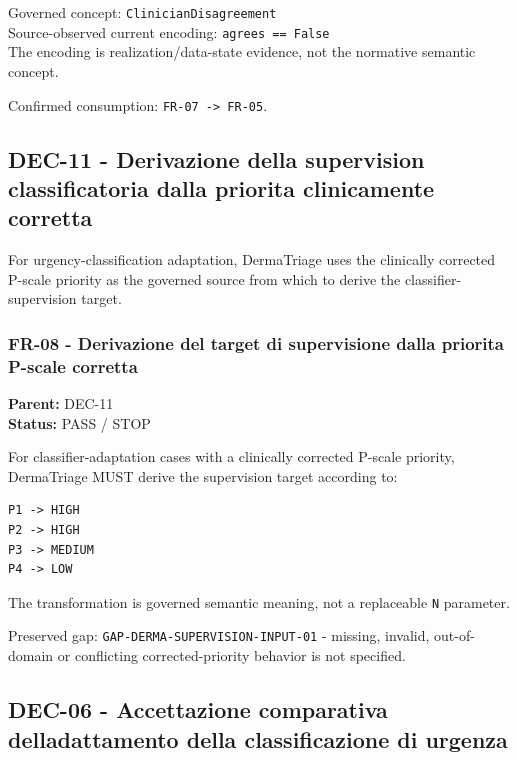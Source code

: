 \documentclass[11pt,a4paper]{article}
\begin{document}
Governed concept: \texttt{ClinicianDisagreement}\\
Source-observed current encoding: \texttt{agrees\ ==\ False}\\
The encoding is realization/data-state evidence, not the normative
semantic concept.

Confirmed consumption: \texttt{FR-07\ -\textgreater{}\ FR-05}.

\subsection{DEC-11 - Derivazione della supervision classificatoria dalla
priorita\textquotesingle{} clinicamente
corretta}\label{dec-11---derivazione-della-supervision-classificatoria-dalla-priorita-clinicamente-corretta}

For urgency-classification adaptation, DermaTriage uses the clinically
corrected P-scale priority as the governed source from which to derive
the classifier-supervision target.

\subsubsection{FR-08 - Derivazione del target di supervisione dalla
priorita\textquotesingle{} P-scale
corretta}\label{fr-08---derivazione-del-target-di-supervisione-dalla-priorita-p-scale-corretta}

\textbf{Parent:} DEC-11\\
\textbf{Status:} PASS / STOP

For classifier-adaptation cases with a clinically corrected P-scale
priority, DermaTriage MUST derive the supervision target according to:

\begin{verbatim}
P1 -> HIGH
P2 -> HIGH
P3 -> MEDIUM
P4 -> LOW
\end{verbatim}

The transformation is governed semantic meaning, not a replaceable
\texttt{N} parameter.

Preserved gap: \texttt{GAP-DERMA-SUPERVISION-INPUT-01} - missing,
invalid, out-of-domain or conflicting corrected-priority behavior is not
specified.

\subsection{DEC-06 - Accettazione comparativa
dell\textquotesingle adattamento della classificazione di
urgenza}\label{dec-06---accettazione-comparativa-delladattamento-della-classificazione-di-urgenza}
\end{document}
